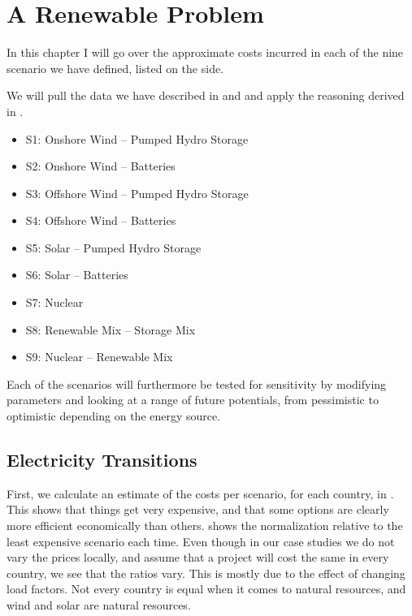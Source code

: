 \setchapterpreamble[u]{\margintoc}
\chapter{A Renewable Problem}

In this chapter I will go over the approximate costs incurred in each of the nine scenario we have defined, listed on the side.

We will pull the data we have described in  and  and apply the reasoning derived in .


\begin{kaobox}[frametitle=Scenarios to consider]

\begin{itemize}
	\item S1: Onshore Wind -- Pumped Hydro Storage
	\item S2: Onshore Wind -- Batteries
	\item S3: Offshore Wind -- Pumped Hydro Storage
	\item S4: Offshore Wind -- Batteries
	\item S5: Solar -- Pumped Hydro Storage
	\item S6: Solar -- Batteries
	\item S7: Nuclear
	\item S8: Renewable Mix -- Storage Mix
	\item S9: Nuclear -- Renewable Mix
\end{itemize}

Each of the scenarios will furthermore be tested for sensitivity by modifying parameters and looking at a range of future potentials, from pessimistic to optimistic depending on the energy source.

\end{kaobox}

\section{Electricity Transitions}

First, we calculate an estimate of the costs per scenario, for each country, in . This shows that things get very expensive, and that some options are clearly more efficient economically than others.  shows the normalization relative to the least expensive scenario each time. Even though in our case studies we do not vary the prices locally, and assume that a project will cost the same in every country, we see that the ratios vary. This is mostly due to the effect of changing load factors. Not every country is equal when it comes to natural resources, and wind and solar are natural resources.


